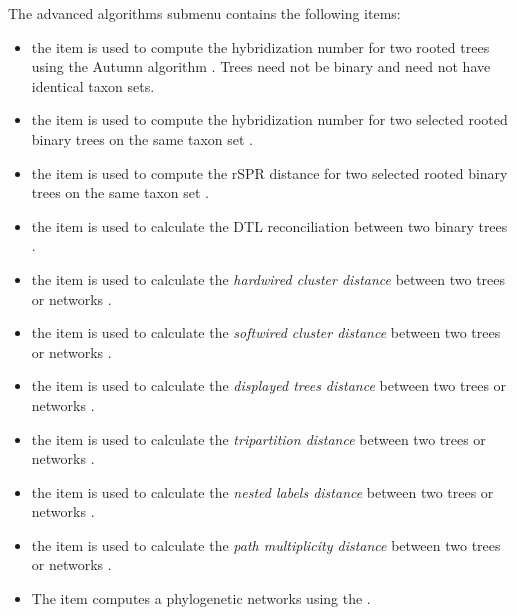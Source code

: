 \documentclass[11pt]{article}
\begin{document}
{\small
The advanced algorithms submenu contains the following items:
\begin{itemize}
\item the  item is used to compute the {hybridization number} for two rooted trees using the Autumn algorithm \cite{HusonLinz2015}. Trees need not be binary and need not have identical taxon
sets.
\item the  item is used to compute the {hybridization number} for two selected rooted binary trees on the same taxon set \cite{Albrecht2012}.
\item the  item  is used to compute the {rSPR distance} for two selected rooted binary trees on the same taxon set \cite{whiddenWABI}.
\item the  item  is used to calculate the {DTL reconciliation} between two binary trees \cite{Doyon10}.
\item the  item  is used to calculate the \emph{hardwired cluster distance} between two trees or networks \cite{PhylogeneticNetworks2010}.
\item the  item  is used to calculate the \emph{softwired cluster distance} between two trees or networks  \cite{PhylogeneticNetworks2010}.
\item the  item  is used to calculate the \emph{displayed trees distance} between two trees or networks \cite{PhylogeneticNetworks2010}.
\item the  item  is used to calculate the \emph{tripartition distance} between two trees or networks \cite{MNWRTPST2004}.
\item the  item  is used to calculate the \emph{nested labels distance} between two trees or networks \cite{CLRV2009d,Nakhleh2009}.
\item the  item  is used to calculate the \emph{path multiplicity distance} between two trees or networks \cite{CardonaTreeChildNetworks2008}.
\item The  item computes a phylogenetic networks using the  \cite{VanIersel2009}.
\end{itemize}
}
\end{document}
